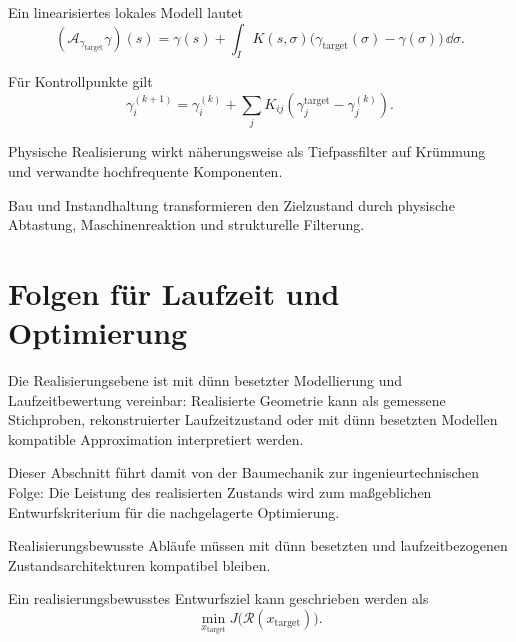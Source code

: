 \begin{definition}
\label{def:kernel-based-adjustment}
Ein linearisiertes lokales Modell lautet
\[
(\mathcal A_{\gamma_{\mathrm{target}}}\gamma)(s)
=
\gamma(s)+
\int_I K(s,\sigma)
\bigl(\gamma_{\mathrm{target}}(\sigma)-\gamma(\sigma)\bigr)
\,\dd\sigma.
\]
\end{definition}

\begin{definition}
\label{def:discrete-adjustment-model}
Für Kontrollpunkte gilt
\[
\gamma_i^{(k+1)}
=
\gamma_i^{(k)}+
\sum_j K_{ij}\left(\gamma_j^{\mathrm{target}}-\gamma_j^{(k)}\right).
\]
\end{definition}

\begin{proposition}
\label{prop:realization-low-pass}
Physische Realisierung wirkt näherungsweise als Tiefpassfilter auf Krümmung
und verwandte hochfrequente Komponenten.
\end{proposition}

\begin{principle}
\label{princ:realization-filter}
Bau und Instandhaltung transformieren den Zielzustand durch physische
Abtastung, Maschinenreaktion und strukturelle Filterung.
\end{principle}

\section{Folgen für Laufzeit und Optimierung}

Die Realisierungsebene ist mit dünn besetzter Modellierung und
Laufzeitbewertung vereinbar: Realisierte Geometrie kann als gemessene
Stichproben, rekonstruierter Laufzeitzustand oder mit dünn besetzten Modellen
kompatible Approximation interpretiert werden.

Dieser Abschnitt führt damit von der Baumechanik zur ingenieurtechnischen
Folge: Die Leistung des realisierten Zustands wird zum maßgeblichen
Entwurfskriterium für die nachgelagerte Optimierung.

\begin{principle}
\label{princ:sparse-realization-compatibility}
Realisierungsbewusste Abläufe müssen mit dünn besetzten und
laufzeitbezogenen Zustandsarchitekturen kompatibel bleiben.
\end{principle}

\begin{definition}
\label{def:realization-aware-objective}
Ein realisierungsbewusstes Entwurfsziel kann geschrieben werden als
\[
\min_{x_{\mathrm{target}}}J\bigl(\mathcal R(x_{\mathrm{target}})\bigr).
\]
\end{definition}

